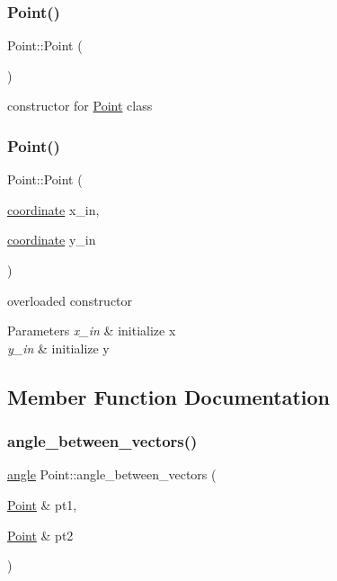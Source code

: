\subsubsection{\texorpdfstring{Point()}{Point()}\hspace{0.1cm}{\footnotesize\ttfamily [1/2]}}
{\footnotesize\ttfamily Point\+::\+Point (\begin{DoxyParamCaption}{ }\end{DoxyParamCaption})}

constructor for \mbox{\hyperlink{class_point}{Point}} class \mbox{\label{class_point_af7373698b9fafc53b0a5d06e511642e1}} 
\subsubsection{\texorpdfstring{Point()}{Point()}\hspace{0.1cm}{\footnotesize\ttfamily [2/2]}}
{\footnotesize\ttfamily Point\+::\+Point (\begin{DoxyParamCaption}\item[{\mbox{\hyperlink{primitives_8h_a9949b5198385a93773b854932cb22e08}{coordinate}}}]{x\+\_\+in,  }\item[{\mbox{\hyperlink{primitives_8h_a9949b5198385a93773b854932cb22e08}{coordinate}}}]{y\+\_\+in }\end{DoxyParamCaption})}

overloaded constructor 
\begin{DoxyParams}{Parameters}
{\em x\+\_\+in} & initialize x \\
\hline
{\em y\+\_\+in} & initialize y \\
\hline
\end{DoxyParams}


\subsection{Member Function Documentation}
\mbox{\label{class_point_a188e0a4a3b9df9e76c749f2139ad0611}} 
\subsubsection{\texorpdfstring{angle\_between\_vectors()}{angle\_between\_vectors()}}
{\footnotesize\ttfamily \mbox{\hyperlink{primitives_8h_a41ee332ff1a31807cb838b616c186dd7}{angle}} Point\+::angle\+\_\+between\+\_\+vectors (\begin{DoxyParamCaption}\item[{\mbox{\hyperlink{class_point}{Point}} \&}]{pt1,  }\item[{\mbox{\hyperlink{class_point}{Point}} \&}]{pt2 }\end{DoxyParamCaption})\hspace{0.3cm}{\ttfamily [static]}}

